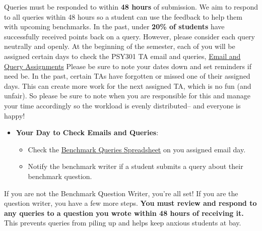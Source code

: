 \documentclass[
]{article}
\providecommand{\tightlist}{%
  \setlength{\itemsep}{0pt}\setlength{\parskip}{0pt}}
\begin{document}
Queries must be responded to within \textbf{48 hours} of submission. We aim to respond to all queries within 48 hours so a student can use the feedback to help them with upcoming benchmarks. In the past, under \textbf{20\% of students} have successfully received points back on a query. However, please consider each query neutrally and openly. At the beginning of the semester, each of you will be assigned certain days to check the PSY301 TA email and queries, \href{https://docs.google.com/spreadsheets/d/1AXT7fqusvnTBZrsaOuhRgZOQ4EmFNt0YmXQNxuAznls/edit?usp=sharing}{Email and Query Assignments} Please be sure to note your dates down and set reminders if need be. In the past, certain TAs have forgotten or missed one of their assigned days. This can create more work for the next assigned TA, which is no fun (and unfair). So please be sure to note when you are responsible for this and manage your time accordingly so the workload is evenly distributed-- and everyone is happy!

\begin{itemize}
\tightlist
\item
  \textbf{Your Day to Check Emails and Queries}:

  \begin{itemize}
  \tightlist
  \item
    Check the \href{https://docs.google.com/spreadsheets/d/157q5gae1Fw06ENQTDr1A2MhT3Q_qqqx4PAqaWady7K8/edit?gid=1566396974\#gid=1566396974}{Benchmark Queries Spreadsheet} on you assigned email day.\\
  \item
    Notify the benchmark writer if a student submits a query about their benchmark question.
  \end{itemize}
\end{itemize}

If you are not the Benchmark Question Writer, you're all set! If you are the question writer, you have a few more steps. \textbf{You must review and respond to any queries to a question you wrote within 48 hours of receiving it.} This prevents queries from piling up and helps keep anxious students at bay.
\end{document}
